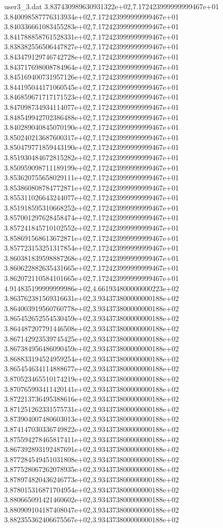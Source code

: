 \begin{filecontents}{user3_3.dat}
3.837430989630931322e+02,7.172423999999999467e+01
3.840098587776313934e+02,7.172423999999999467e+01
3.840336661083455283e+02,7.172423999999999467e+01
3.841788858761528331e+02,7.172423999999999467e+01
3.838382556506447827e+02,7.172423999999999467e+01
3.843479129746742728e+02,7.172423999999999467e+01
3.843717698008784964e+02,7.172423999999999467e+01
3.845169400731957126e+02,7.172423999999999467e+01
3.844195044171060545e+02,7.172423999999999467e+01
3.846859671717171523e+02,7.172423999999999467e+01
3.847098734934114077e+02,7.172423999999999467e+01
3.848549942702386488e+02,7.172423999999999467e+01
3.840289040845070190e+02,7.172423999999999467e+01
3.850240213687600317e+02,7.172423999999999467e+01
3.850479771859443190e+02,7.172423999999999467e+01
3.851930484672815282e+02,7.172423999999999467e+01
3.850959098711189199e+02,7.172423999999999467e+01
3.853620755658029111e+02,7.172423999999999467e+01
3.853860808784772871e+02,7.172423999999999467e+01
3.855311026643244077e+02,7.172423999999999467e+01
3.851918595310668252e+02,7.172423999999999467e+01
3.857001297628458474e+02,7.172423999999999467e+01
3.857241845710102552e+02,7.172423999999999467e+01
3.858691568613672871e+02,7.172423999999999467e+01
3.857723153251317854e+02,7.172423999999999467e+01
3.860381839598887268e+02,7.172423999999999467e+01
3.860622882635431665e+02,7.172423999999999467e+01
3.862072110584101665e+02,7.172423999999999467e+01
4.914835199999999986e+02,4.661934800000000223e+02
3.863762381569316631e+02,3.934373800000000188e+02
3.864003919560760778e+02,3.934373800000000188e+02
3.865452652554530459e+02,3.934373800000000188e+02
3.864487207791446508e+02,3.934373800000000188e+02
3.867142923539745425e+02,3.934373800000000188e+02
3.867384956486090459e+02,3.934373800000000188e+02
3.868833194524959254e+02,3.934373800000000188e+02
3.865454634114888677e+02,3.934373800000000188e+02
3.870523465510174219e+02,3.934373800000000188e+02
3.870765993411420141e+02,3.934373800000000188e+02
3.872213736495388616e+02,3.934373800000000188e+02
3.871251262331575731e+02,3.934373800000000188e+02
3.873904007480603013e+02,3.934373800000000188e+02
3.874147030336749822e+02,3.934373800000000188e+02
3.875594278465817411e+02,3.934373800000000188e+02
3.867392893192487691e+02,3.934373800000000188e+02
3.877284549451031808e+02,3.934373800000000188e+02
3.877528067262078935e+02,3.934373800000000188e+02
3.878974820436246773e+02,3.934373800000000188e+02
3.878015316871704954e+02,3.934373800000000188e+02
3.880665091421460602e+02,3.934373800000000188e+02
3.880909104187408047e+02,3.934373800000000188e+02
3.882355362406675567e+02,3.934373800000000188e+02

\end{filecontents}
